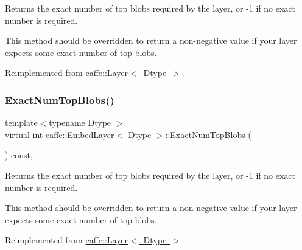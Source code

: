 Returns the exact number of top blobs required by the layer, or -\/1 if no exact number is required. 

This method should be overridden to return a non-\/negative value if your layer expects some exact number of top blobs. 

Reimplemented from \mbox{\hyperlink{classcaffe_1_1_layer_a64e2ca72c719e4b2f1f9216ccfb0d37f}{caffe\+::\+Layer$<$ Dtype $>$}}.

\mbox{\label{classcaffe_1_1_embed_layer_af02f4561fa25a979e523aae851bed39d}} 
\subsubsection{\texorpdfstring{Exact\+Num\+Top\+Blobs()}{ExactNumTopBlobs()}\hspace{0.1cm}{\footnotesize\ttfamily [2/2]}}
{\footnotesize\ttfamily template$<$typename Dtype $>$ \\
virtual int \mbox{\hyperlink{classcaffe_1_1_embed_layer}{caffe\+::\+Embed\+Layer}}$<$ Dtype $>$\+::Exact\+Num\+Top\+Blobs (\begin{DoxyParamCaption}{ }\end{DoxyParamCaption}) const\hspace{0.3cm}{\ttfamily [inline]}, {\ttfamily [virtual]}}



Returns the exact number of top blobs required by the layer, or -\/1 if no exact number is required. 

This method should be overridden to return a non-\/negative value if your layer expects some exact number of top blobs. 

Reimplemented from \mbox{\hyperlink{classcaffe_1_1_layer_a64e2ca72c719e4b2f1f9216ccfb0d37f}{caffe\+::\+Layer$<$ Dtype $>$}}.

\mbox{\label{classcaffe_1_1_embed_layer_aaace16d2beba7db887c7b59213268bc2}} 
